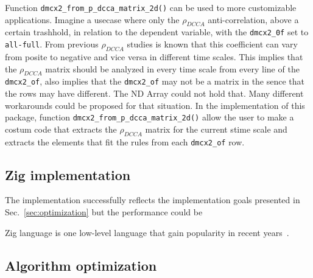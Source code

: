 \documentclass[article]{jss}
\begin{document}
Function \verb"dmcx2_from_p_dcca_matrix_2d()" can be used to more customizable applications. Imagine a usecase where only the $\rho_{DCCA}$ anti-correlation, above a certain trashhold, in relation to the dependent variable, with the \verb"dmcx2_0f" set to \verb"all-full". From previous $\rho_{DCCA}$ studies is known that this coefficient can vary from posite to negative and vice  versa in different time scales. This implies that the $\rho_{DCCA}$ matrix should be analyzed in every time scale from every line of the \verb"dmcx2_of", also implies that the \verb"dmcx2_of" may not be a matrix in the sence that the rows may have different. The  ND Array could not hold that. Many different workarounds could be proposed for that situation. In the implementation of this package, function \verb"dmcx2_from_p_dcca_matrix_2d()" allow the user to make a costum code that extracts the  $\rho_{DCCA}$ matrix for the current stime scale and extracts the elements that fit the rules from each \verb"dmcx2_of" row.

\subsection{Zig implementation}

The  implementation successfully reflects the implementation goals presented in Sec.~\ref{sec:optimization} but the performance could be 

Zig language is one low-level language that gain popularity in recent years~\citep{10820804}. 

\subsection{Algorithm optimization}







 

\end{document}
